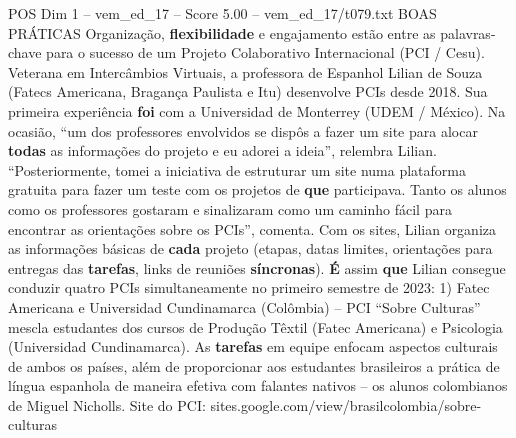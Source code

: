 \begin{textsample}{POS Dim 1 – vem\_ed\_17 – Score 5.00 – vem\_ed\_17/t079.txt}  \label{ex:f1_pos_136}
BOAS PRÁTICAS Organização, \textbf{flexibilidade} e engajamento estão entre as palavras-chave para o sucesso de um Projeto Colaborativo Internacional (PCI / Cesu).
Veterana em Intercâmbios Virtuais, a professora de Espanhol Lilian de Souza (Fatecs Americana, Bragança Paulista e Itu) desenvolve PCIs desde 2018.
Sua primeira experiência \textbf{foi} com a Universidad de Monterrey (UDEM / México).
Na ocasião, “um dos professores envolvidos se dispôs a fazer um site para alocar \textbf{todas} as informações do projeto e eu adorei a ideia”, relembra Lilian. “Posteriormente, tomei a iniciativa de estruturar um site numa plataforma gratuita para fazer um teste com os projetos de \textbf{que} participava.
Tanto os alunos como os professores gostaram e sinalizaram como um caminho fácil para encontrar as orientações sobre os PCIs”, comenta.
Com os sites, Lilian organiza as informações básicas de \textbf{cada} projeto (etapas, datas limites, orientações para entregas das \textbf{tarefas}, links de reuniões \textbf{síncronas}). \textbf{É} assim \textbf{que} Lilian consegue conduzir quatro PCIs simultaneamente no primeiro semestre de 2023: 1) Fatec Americana e Universidad Cundinamarca (Colômbia) – PCI “Sobre Culturas” mescla estudantes dos cursos de Produção Têxtil (Fatec Americana) e Psicologia (Universidad Cundinamarca).
As \textbf{tarefas} em equipe enfocam aspectos culturais de ambos os países, além de proporcionar aos estudantes brasileiros a prática de língua espanhola de maneira efetiva com falantes nativos – os alunos colombianos de Miguel Nicholls.
Site do PCI: sites.google.com/view/brasilcolombia/sobre-culturas

\end{textsample}
